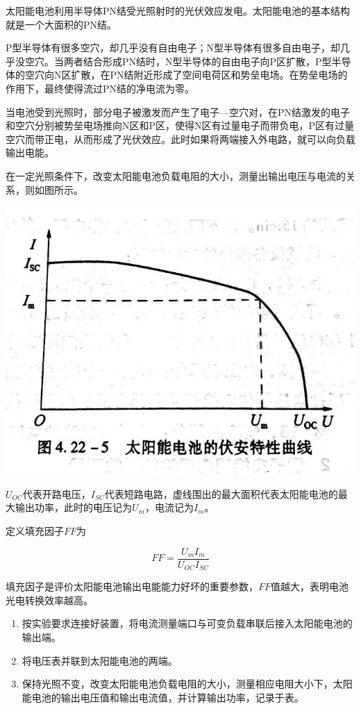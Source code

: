 \documentclass[UTF-8, a4paper, 12pt]{ctexart}
\begin{document}
    太阳能电池利用半导体PN结受光照射时的光伏效应发电。太阳能电池的基本结构就是一个大面积的PN结。

    P型半导体有很多空穴，却几乎没有自由电子；N型半导体有很多自由电子，却几乎没空穴。当两者结合形成PN结时，N型半导体的自由电子向P区扩散，P型半导体的空穴向N区扩散，在PN结附近形成了空间电荷区和势垒电场。在势垒电场的作用下，最终使得流过PN结的净电流为零。

    当电池受到光照时，部分电子被激发而产生了电子—空穴对，在PN结激发的电子和空穴分别被势垒电场推向N区和P区，使得N区有过量电子而带负电，P区有过量空穴而带正电，从而形成了光伏效应。此时如果将两端接入外电路，就可以向负载输出电能。

    在一定光照条件下，改变太阳能电池负载电阻的大小，测量出输出电压与电流的关系，则如图所示。

    \begin{center}
        \includegraphics{4.22_2.jpg}
    \end{center}

    $U_{OC}$代表开路电压，$I_{SC}$代表短路电路，虚线围出的最大面积代表太阳能电池的最大输出功率，此时的电压记为$U_m$，电流记为$I_m$。

    定义填充因子$FF$为

    $$FF = \frac{U_m I_m}{U_{OC} I_{SC}}$$

    填充因子是评价太阳能电池输出电能能力好坏的重要参数，$FF$值越大，表明电池光电转换效率越高。

    \textbf{ }

    \songti

    \begin{enumerate}[（1）]
        \item 按实验要求连接好装置，将电流测量端口与可变负载串联后接入太阳能电池的输出端。

        \item 将电压表并联到太阳能电池的两端。
        
        \item 保持光照不变，改变太阳能电池负载电阻的大小，测量相应电阻大小下，太阳能电池的输出电压值和输出电流值，并计算输出功率，记录于表。
    \end{enumerate}
\end{document}
